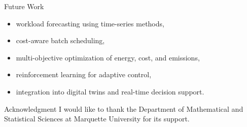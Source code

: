 \documentclass[
  ignorenonframetext,
  aspectratio=169,
]{beamer}
\providecommand{\tightlist}{%
  \setlength{\itemsep}{0pt}\setlength{\parskip}{0pt}}\usepackage{longtable,booktabs,array}
\begin{document}
\begin{frame}{Future Work}
\label{future-work}
\begin{itemize}
\tightlist
\item
  workload forecasting using time-series methods,
\item
  cost-aware batch scheduling,
\item
  multi-objective optimization of energy, cost, and emissions,
\item
  reinforcement learning for adaptive control,
\item
  integration into digital twins and real-time decision support.
\end{itemize}
\end{frame}

\begin{frame}{Acknowledgment}
\label{acknowledgment}
I would like to thank the Department of Mathematical and Statistical
Sciences at Marquette University for its support.
\end{frame}
\end{document}
